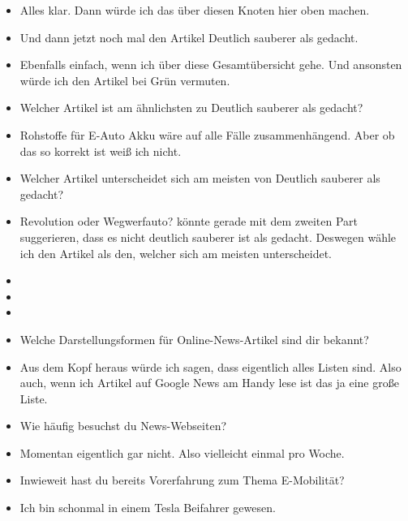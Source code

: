 {\begin{itemize}[]
                  Es wäre aber wichtig, wenn du einfach dein Vorgehen beschreibst wie du es gerade gemacht hast.
            \item {} Alles klar. Dann würde ich das über diesen Knoten hier oben machen.
            \item {} Und dann jetzt noch mal den Artikel \flqq Deutlich sauberer als gedacht\frqq{}.
            \item {} Ebenfalls einfach, wenn ich über diese Gesamtübersicht gehe.
                  Und ansonsten würde ich den Artikel bei Grün vermuten.
            \item {} Welcher Artikel ist am ähnlichsten zu \flqq Deutlich sauberer als gedacht\frqq{}?
            \item {} \flqq Rohstoffe für E-Auto Akku\frqq{} wäre auf alle Fälle zusammenhängend.
                  Aber ob das so korrekt ist weiß ich nicht.
            \item {} Welcher Artikel unterscheidet sich am meisten von \flqq Deutlich sauberer als gedacht\frqq{}?
            \item {} \flqq Revolution oder Wegwerfauto?\frqq{} könnte gerade mit dem zweiten Part suggerieren, dass es nicht deutlich sauberer ist als gedacht.
                  Deswegen wähle ich den Artikel als den, welcher sich am meisten unterscheidet.
            \item {}
            \item {}
            \item {}
            \item {} Welche Darstellungsformen für Online-News-Artikel sind dir bekannt?
            \item {} Aus dem Kopf heraus würde ich sagen, dass eigentlich alles Listen sind.
                  Also auch, wenn ich Artikel auf Google News am Handy lese ist das ja eine große Liste.
            \item {} Wie häufig besuchst du News-Webseiten?
            \item {} Momentan eigentlich gar nicht. Also vielleicht einmal pro Woche.
            \item {} Inwieweit hast du bereits Vorerfahrung zum Thema E-Mobilität?
            \item {} Ich bin schonmal in einem Tesla Beifahrer gewesen.

\end{itemize}}
